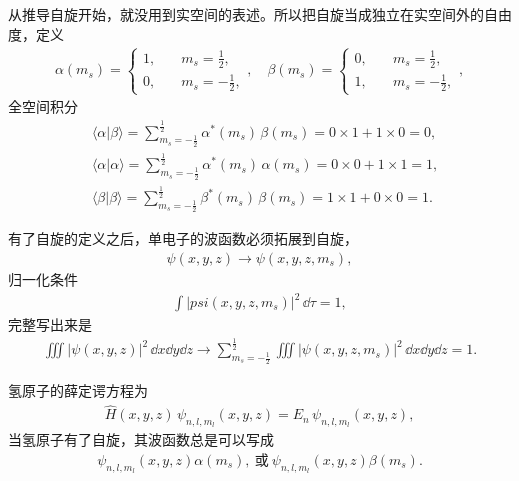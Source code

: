 从推导自旋开始，就没用到实空间的表述。所以把自旋当成独立在实空间外的自由度，定义
\begin{align}
    \alpha(m_s) = \begin{cases}
        1, \quad & m_s = \frac12, \\
        0, \quad & m_s = -\frac12, 
    \end{cases}, \quad 
    \beta(m_s) = \begin{cases}
        0, \quad & m_s = \frac12, \\
        1, \quad & m_s = -\frac12, 
    \end{cases},  
\end{align}
全空间积分
\begin{align}
&\langle \alpha | \beta \rangle = \sum_{m_s = -\frac12}^{\frac12} 
\alpha^*(m_s)\, \beta(m_s) = 0\times1 + 1\times 0 = 0, \\
&\langle \alpha | \alpha \rangle = \sum_{m_s = -\frac12}^{\frac12} \alpha^*(m_s)\, \alpha(m_s) = 0\times0 + 1\times1 = 1, \\
&\langle \beta | \beta \rangle = \sum_{m_s = -\frac12}^{\frac12} \beta^*(m_s)\, \beta(m_s) = 1\times1 + 0\times 0 = 1. 
\end{align}

有了自旋的定义之后，单电子的波函数必须拓展到自旋，
\begin{align}
    \psi(x,y,z) \rightarrow \psi(x,y,z, m_s),
\end{align}
归一化条件
\begin{align}
    \int |psi(x,y,z,m_s)|^2\,\dd\tau = 1,
\end{align}
完整写出来是
\begin{align}
    \iiint |\psi(x,y,z)|^2 \,\dd x\dd y \dd z 
    \rightarrow \sum_{m_s=-\frac12}^{\frac12} \iiint |\psi(x,y,z,m_s)|^2\,\dd x\dd y\dd z = 1. 
\end{align}

氢原子的薛定谔方程为
\begin{align}
    \hat H(x,y,z) \, \psi_{n,l,m_l}(x,y,z) = E_n \, \psi_{n,l,m_l}(x,y,z),
\end{align}
当氢原子有了自旋，其波函数总是可以写成
\begin{align}
    \psi_{n,l,m_l}(x,y,z) \alpha(m_s), \ \text{或} \ 
    \psi_{n,l,m_l}(x,y,z) \beta(m_s).
\end{align}
